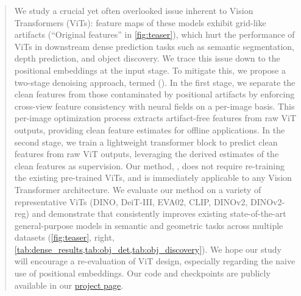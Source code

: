 \begin{abstract}
    We study a crucial yet often overlooked issue inherent to Vision Transformers (ViTs): feature maps of these models exhibit grid-like artifacts (``Original features'' in \cref{fig:teaser}), which hurt the performance of ViTs in downstream dense prediction tasks such as semantic segmentation, depth prediction, and object discovery.
    We trace this issue down to the positional embeddings at the input stage.
    To mitigate this, we propose a two-stage denoising approach, termed \ourslong (\ours).
    In the first stage, we separate the clean features from those contaminated by positional artifacts by enforcing cross-view feature consistency with neural fields on a per-image basis. This per-image optimization process extracts artifact-free features from raw ViT outputs, providing clean feature estimates for offline applications. In the second stage, we train a lightweight transformer block to predict clean features from raw ViT outputs, leveraging the derived estimates of the clean features as supervision. Our method, \ours{}, does not require re-training the existing pre-trained ViTs, and is immediately applicable to any Vision Transformer architecture. We evaluate our method on a variety of representative ViTs (DINO, DeiT-III, EVA02, CLIP, DINOv2, DINOv2-reg) and demonstrate that \ours consistently improves existing state-of-the-art general-purpose models in semantic and geometric tasks across multiple datasets (\cref{fig:teaser}, right, \cref{tab:dense_results,tab:obj_det,tab:obj_discovery}).
    We hope our study will encourage a re-evaluation of ViT design, especially regarding the naive use of positional embeddings. Our code and checkpoints are publicly available in our \href{https://jiawei-yang.github.io/DenoisingViT/}{project page}.
\end{abstract}
